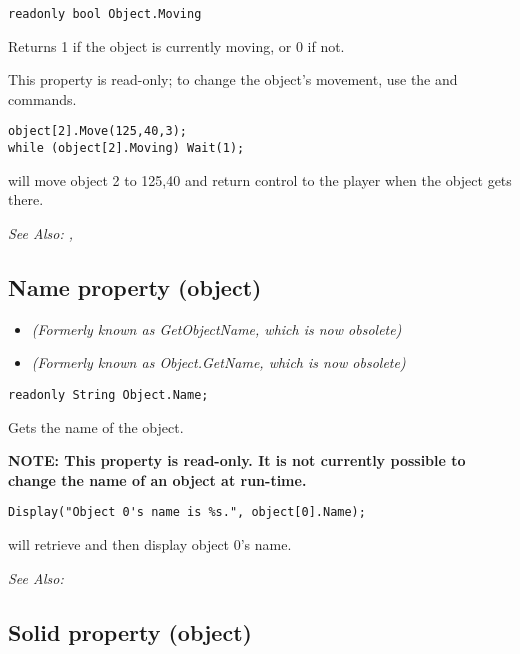 \begin{verbatim}
readonly bool Object.Moving
\end{verbatim}
Returns 1 if the object is currently moving, or 0 if not.

This property is read-only; to change the object's movement, use the 
and  commands.

\begin{verbatim}
object[2].Move(125,40,3);
while (object[2].Moving) Wait(1);
\end{verbatim}
will move object 2 to 125,40 and return control to the player when the object gets there.

\it{See Also:} ,


\subsection{Name property (object)}\label{Object.Name}%

\begin{itemize}
\item \it{(Formerly known as GetObjectName, which is now obsolete)}
\item \it{(Formerly known as Object.GetName, which is now obsolete)}
\end{itemize}

\begin{verbatim}
readonly String Object.Name;
\end{verbatim}
Gets the name of the object.

\bf{NOTE}: This property is read-only. It is not currently possible to change the name
of an object at run-time.

\begin{verbatim}
Display("Object 0's name is %s.", object[0].Name);
\end{verbatim}
will retrieve and then display object 0's name.

\it{See Also:} 


\subsection{Solid property (object)}\label{Object.Solid}%

